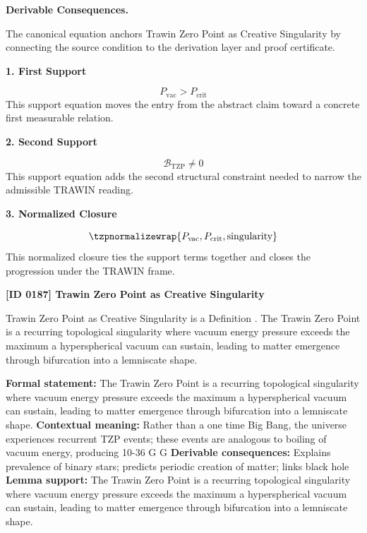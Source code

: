 \par\vspace{0.35em}
\noindent\textbf{Derivable Consequences.}\quad
\begingroup
\footnotesize
\raggedright
The canonical equation anchors Trawin Zero Point as Creative Singularity by connecting the source condition to the derivation layer and proof certificate.
\par\endgroup

\noindent\textbf{1. First Support}\par
\[
P_{\mathrm{vac}} > P_{\mathrm{crit}}
\]
\noindent This support equation moves the entry from the abstract claim toward a concrete first measurable relation.\par
\noindent\textbf{2. Second Support}\par
\[
\mathcal{B}_{\mathrm{TZP}} \neq 0
\]
\noindent This support equation adds the second structural constraint needed to narrow the admissible TRAWIN reading.\par
\noindent\textbf{3. Normalized Closure}\par
\[
\tzpnormalizewrap{P_{\mathrm{vac}},P_{\mathrm{crit}},\text{singularity}}
\]
\noindent This normalized closure ties the support terms together and closes the progression under the TRAWIN frame.\par

\clearpage
\noindent\textbf{[ID 0187] Trawin Zero Point as Creative Singularity}\par
\vspace{0.35em}
\begingroup\small
{}
Trawin Zero Point as Creative Singularity is a Definition  . The Trawin Zero Point is a recurring topological singularity where vacuum energy pressure exceeds the maximum a hyperspherical vacuum can sustain, leading to matter emergence through bifurcation into a lemniscate shape.  

\begingroup\footnotesize\setlength{\emergencystretch}{3em}\sloppy
\textbf{Formal statement:} The Trawin Zero Point is a recurring topological singularity where vacuum energy pressure exceeds the maximum a hyperspherical vacuum can sustain, leading to matter emergence through bifurcation into a lemniscate shape.  
\textbf{Contextual meaning:} Rather than a one time Big Bang, the universe experiences recurrent TZP events; these events are analogous to boiling of vacuum energy, producing  10-36 G G
\textbf{Derivable consequences:} Explains prevalence of binary stars; predicts periodic creation of matter; links black hole
\textbf{Lemma support:} The Trawin Zero Point is a recurring topological singularity where vacuum energy pressure exceeds the maximum a hyperspherical vacuum can sustain, leading to matter emergence through bifurcation into a lemniscate shape.  \par
\endgroup

